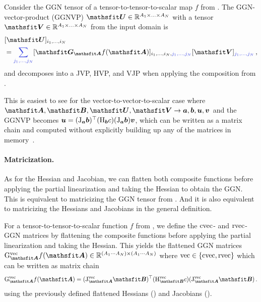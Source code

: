 \begin{definition}\label{def:ggnvp}%
  Consider the GGN tensor of a tensor-to-tensor-to-scalar map $f$ from .
  The GGN-vector-product (GGNVP) $\tU \in \sR^{A_1 \times \ldots \times A_N}$ with a tensor $\tV \in \sR^{A_1 \times \ldots \times A_N}$ from the input domain is
  \begin{align*}
    & [\tU]_{i_1, \dots, i_N}
    \\
    & =
      \colored{\sum_{j_1, \dots, j_N}}
      [\tG_{\tA} f(\tA)]_{i_1, \dots, i_N, \colored{j_1, \dots, j_N}}
      [\tV]_{\colored{j_1, \dots, j_N}}\,,
  \end{align*}
  and decomposes into a JVP, HVP, and VJP when applying the composition from .
\end{definition}
This is easiest to see for the vector-to-vector-to-scalar case where $\tA, \tB, \tU, \tV \to \va, \vb, \vu, \vv$ and the GGNVP becomes ${\bm{u}} = (\mathrm{J}_{{\bm{a}}}{\bm{b}})^{\top} (\mathrm{H}_{{\bm{b}}} c) (\mathrm{J}_{{\bm{a}}} {\bm{b}}) {\bm{v}}$, which can be written as a matrix chain and computed without explicitly building up any of the matrices in memory~\cite{schraudolph2002fast}.

\paragraph{Matricization.} As for the Hessian and Jacobian, we can flatten both composite functions before applying the partial linearization and taking the Hessian to obtain the GGN.
This is equivalent to matricizing the GGN tensor from .
And it is also equivalent to matricizing the Hessians and Jacobians in the general definition.

\begin{definition}\label{def:vec_ggns}
  For a tensor-to-tensor-to-scalar function $f$ from , we define the $\operatorname{cvec}$- and $\operatorname{rvec}$-GGN matrices by flattening the composite functions before applying the partial linearization and taking the Hessian. This yields the flattened GGN matrices $\ggn^{\vec}_{\tA}f(\tA) \in \sR^{(A_1 \cdots A_N) \times (A_1 \cdots A_N)}$ where $\operatorname{vec} \in \{\operatorname{cvec}, \operatorname{rvec}\}$ which can be written as matrix chain
  \begin{align*}
    \ggn^{\vec}_{\tA} f(\tA)
    =
    (\jac^{\vec}_{\tA} \tB)^{\top}
    (\hess^{\vec}_{\tB} c)
    (\jac^{\vec}_{\tA} \tB)\,.
  \end{align*}
  using the previously defined flattened Hessians () and Jacobians ().
\end{definition}

